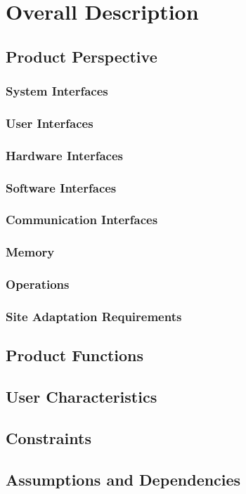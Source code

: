 \documentclass[12pt, a4paper]{article}
\begin{document}
\section{Overall Description}
	\subsection{Product Perspective}
		\subsubsection{System Interfaces}
		\subsubsection{User Interfaces}
		\subsubsection{Hardware Interfaces}
		\subsubsection{Software Interfaces}
		\subsubsection{Communication Interfaces}
		\subsubsection{Memory}
		\subsubsection{Operations}
		\subsubsection{Site Adaptation Requirements}
	\subsection{Product Functions}
	\subsection{User Characteristics}
	\subsection{Constraints}
	\subsection{Assumptions and Dependencies}
\end{document}
